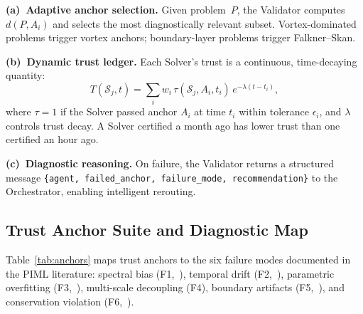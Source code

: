 \documentclass[conference]{IEEEtran}
\begin{document}
\textbf{(a)~Adaptive anchor selection.} Given problem~$P$, the Validator computes $d(P, A_i)$ and selects the most diagnostically relevant subset. Vortex-dominated problems trigger vortex anchors; boundary-layer problems trigger Falkner--Skan.

\textbf{(b)~Dynamic trust ledger.} Each Solver's trust is a continuous, time-decaying quantity:
\begin{equation}\label{eq:trust-score}
  T(\mathcal{S}_j, t) = \sum_i w_i\, \tau(\mathcal{S}_j, A_i, t_i)\, e^{-\lambda(t - t_i)},
\end{equation}
where $\tau = 1$ if the Solver passed anchor $A_i$ at time $t_i$ within tolerance $\epsilon_i$, and $\lambda$ controls trust decay. A Solver certified a month ago has lower trust than one certified an hour ago.

\textbf{(c)~Diagnostic reasoning.} On failure, the Validator returns a structured message \texttt{\{agent, failed\_anchor, failure\_mode, recommendation\}} to the Orchestrator, enabling intelligent rerouting.

\subsection{Trust Anchor Suite and Diagnostic Map}

Table~\ref{tab:anchors} maps trust anchors to the six failure modes documented in the PIML literature: spectral bias (F1,~\cite{Rahaman2019}), temporal drift (F2,~\cite{Wang2021}), parametric overfitting (F3,~\cite{Li2021FNO}), multi-scale decoupling (F4), boundary artifacts (F5,~\cite{Hao2024}), and conservation violation (F6,~\cite{Park2021}).
\end{document}
